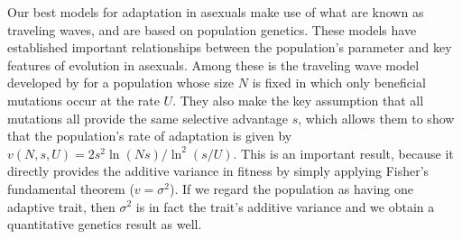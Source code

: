 \documentclass[11pt,twocolumn]{article}
\begin{document}
Our best models for adaptation in asexuals make use of what are known as traveling waves, and are based on population genetics. These models have established important relationships between the population's parameter and key features of evolution in asexuals. Among these is the traveling wave model developed by \citet{desai2007beneficial} for a population whose size $N$ is fixed in which only beneficial mutations occur at the rate $U$. They also make the key assumption that all mutations all provide the same selective advantage $s$, which allows them to show that the population's rate of adaptation is given by  $v(N,s,U) = 2s^2 \ln(N s)/\ln^2(s/U)$. This is an important result, because it directly provides the additive variance in fitness by simply applying Fisher's fundamental theorem ($v=\sigma^2$). If we regard the population as having one adaptive trait, then $\sigma^2$ is in fact the trait's additive variance and we obtain a quantitative genetics result as well.\par
% 
% 
% 
%
\end{document}
